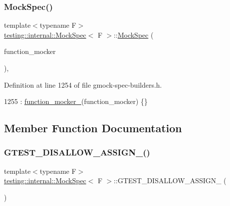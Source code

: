 \subsubsection{\texorpdfstring{Mock\+Spec()}{MockSpec()}}
{\footnotesize\ttfamily template$<$typename F$>$ \\
\hyperlink{classtesting_1_1internal_1_1MockSpec}{testing\+::internal\+::\+Mock\+Spec}$<$ F $>$\+::\hyperlink{classtesting_1_1internal_1_1MockSpec}{Mock\+Spec} (\begin{DoxyParamCaption}\item[{\hyperlink{classtesting_1_1internal_1_1FunctionMockerBase}{internal\+::\+Function\+Mocker\+Base}$<$ F $>$ $\ast$}]{function\+\_\+mocker }\end{DoxyParamCaption})\hspace{0.3cm}{\ttfamily [inline]}, {\ttfamily [explicit]}}



Definition at line 1254 of file gmock-\/spec-\/builders.\+h.


\begin{DoxyCode}
1255       : \hyperlink{classtesting_1_1internal_1_1MockSpec_a9dafaf30cc5ecfe824d1b92949e2054a}{function\_mocker\_}(function\_mocker) \{\}
\end{DoxyCode}


\subsection{Member Function Documentation}
\mbox{\label{classtesting_1_1internal_1_1MockSpec_acab7269f80d53da2aef9d94c5febe6c5}} 
\subsubsection{\texorpdfstring{G\+T\+E\+S\+T\+\_\+\+D\+I\+S\+A\+L\+L\+O\+W\+\_\+\+A\+S\+S\+I\+G\+N\+\_\+()}{GTEST\_DISALLOW\_ASSIGN\_()}}
{\footnotesize\ttfamily template$<$typename F$>$ \\
\hyperlink{classtesting_1_1internal_1_1MockSpec}{testing\+::internal\+::\+Mock\+Spec}$<$ F $>$\+::G\+T\+E\+S\+T\+\_\+\+D\+I\+S\+A\+L\+L\+O\+W\+\_\+\+A\+S\+S\+I\+G\+N\+\_\+ (\begin{DoxyParamCaption}\item[{\hyperlink{classtesting_1_1internal_1_1MockSpec}{Mock\+Spec}$<$ F $>$}]{ }\end{DoxyParamCaption})\hspace{0.3cm}{\ttfamily [private]}}

